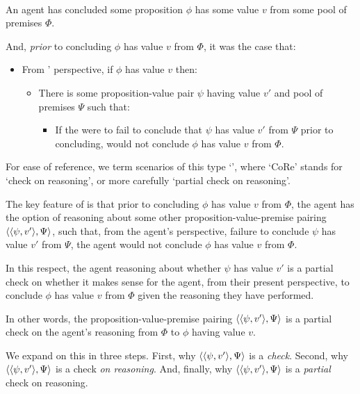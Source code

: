 \begin{note}
  \begin{scenarioType}\mbox{ }

    An agent \vAgent{} has concluded some proposition \(\phi\) has some value \(v\) from some pool of premises \(\Phi\).

    And, \emph{prior} to concluding \(\phi\) has value \(v\) from \(\Phi\), it was the case that:
    \begin{itemize}
    \item
      From \vAgent{}' perspective, if \(\phi\) has value \(v\) then:
      \begin{itemize}
      \item
        There is some proposition-value pair \(\psi\) having value \(v'\) and pool of premises \(\Psi\) such that:
        \begin{itemize}
        \item
          If the \vAgent{} were to fail to conclude that \(\psi\) has value \(v'\) from \(\Psi\) prior to concluding, \vAgent{} would not conclude \(\phi\) has value \(v\) from \(\Phi\).
        \end{itemize}
      \end{itemize}
    \end{itemize}
    \vspace{-\baselineskip}
  \end{scenarioType}

  For ease of reference, we term scenarios of this type `', where `CoRe' stands for `check on reasoning', or more carefully `partial check on reasoning'.

  The key feature of  is that prior to concluding \(\phi\) has value \(v\) from \(\Phi\), the agent has the option of reasoning about some other proposition-value-premise pairing \(\langle \langle \psi, v' \rangle, \Psi \rangle\), such that, from the agent's perspective, failure to conclude \(\psi\) has value \(v'\) from \(\Psi\), the agent would not conclude \(\phi\) has value \(v\) from \(\Phi\).

  In this respect, the agent reasoning about whether \(\psi\) has value \(v'\) is a partial check on whether it makes sense for the agent, from their present perspective, to conclude \(\phi\) has value \(v\) from \(\Phi\) given the reasoning they have performed.

  In other words, the proposition-value-premise pairing \(\langle \langle \psi, v' \rangle, \Psi \rangle\) is a partial check on the agent's reasoning from \(\Phi\) to \(\phi\) having value \(v\).

  We expand on this in three steps.
  First, why \(\langle \langle \psi, v' \rangle, \Psi \rangle\) is a \emph{check}.
  Second, why \(\langle \langle \psi, v' \rangle, \Psi \rangle\) is a check \emph{on reasoning}.
  And, finally, why \(\langle \langle \psi, v' \rangle, \Psi \rangle\) is a \emph{partial} check on reasoning.
\end{note}

